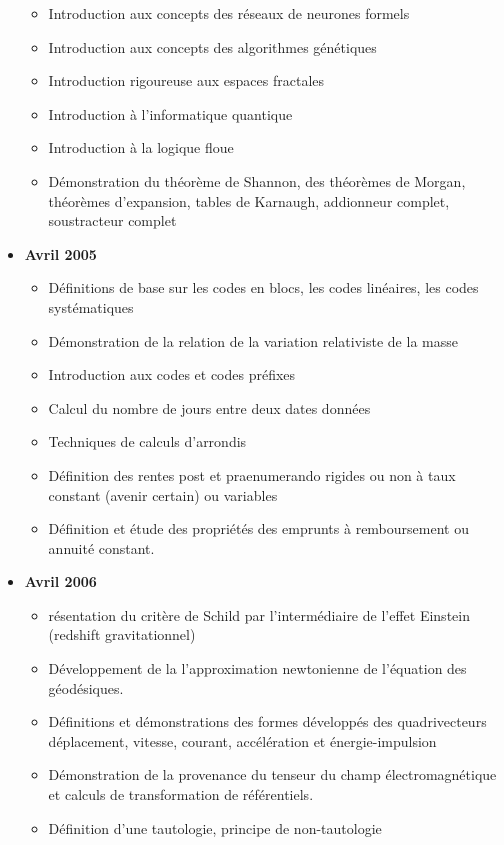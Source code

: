 \documentclass[12pt,a4paper,twoside,openright]{report}
\theoremstyle{definition}
\theoremstyle{itexmp}
\numberwithin{equation}{section}
\begin{document}
\begin{itemize}
\begin{itemize}[noitemsep]
				\item Introduction aux concepts des réseaux de neurones formels
				\item Introduction aux concepts des algorithmes génétiques
				\item Introduction rigoureuse aux espaces fractales
				\item Introduction à l'informatique quantique
				\item Introduction à la logique floue
				\item Démonstration du théorème de Shannon, des théorèmes de Morgan, théorèmes d'expansion, tables de Karnaugh, addionneur complet, soustracteur complet
			\end{itemize}
		\item \textbf{Avril 2005}
			\begin{itemize}[noitemsep]
				\item Définitions de base sur les codes en blocs, les codes linéaires, les codes systématiques
				\item Démonstration de la relation de la variation relativiste de la masse
				\item Introduction aux codes et codes préfixes
				\item Calcul du nombre de jours entre deux dates données
				\item Techniques de calculs d'arrondis
				\item Définition des rentes post et praenumerando rigides ou non à taux constant (avenir certain) ou variables
				\item Définition et étude des propriétés des emprunts à remboursement ou annuité constant. 
			\end{itemize}
		\item \textbf{Avril 2006}
			\begin{itemize}[noitemsep]
				\item résentation du critère de Schild par l'intermédiaire de l'effet Einstein (redshift gravitationnel)
				\item Développement de la l'approximation newtonienne de l'équation des géodésiques.
				\item Définitions et démonstrations des formes développés des quadrivecteurs déplacement, vitesse, courant, accélération et énergie-impulsion
				\item Démonstration de la provenance du tenseur du champ électromagnétique et calculs de transformation de référentiels.
				\item Définition d'une tautologie, principe de non-tautologie

\end{itemize}
\end{itemize}
\end{document}
